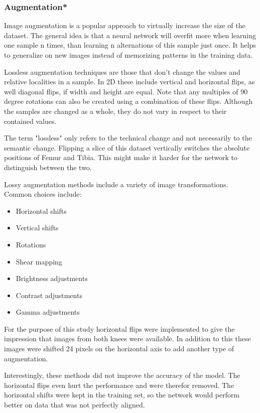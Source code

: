 \subsubsection{Augmentation*}

Image augmentation is a popular approach to virtually increase the size of the dataset. The general idea is that a neural network will overfit more when learning one sample n times, than learning n alternations of this sample just once. It helps to generalize on new images instead of memorizing patterns in the training data.

Lossless augmentation techniques are those that don't change the values and relative localities in a sample. In 2D these include vertical and horizontal flips, as well diagonal flips, if width and height are equal. Note that any multiples of 90 degree rotations can also be created using a combination of these flips. Although the samples are changed as a whole, they do not vary in respect to their contained values. 

The term "lossless" only refers to the technical change and not necessarily to the semantic change. Flipping a slice of this dataset vertically switches the absolute positions of Femur and Tibia. This might make it harder for the network to distinguish between the two.

Lossy augmentation methods include a variety of image transformations. Common choices include:

\begin{itemize}
\item Horizontal shifts
\item Vertical shifts
\item Rotations
\item Shear mapping
\item Brightness adjustments
\item Contrast adjustments
\item Gamma adjustments
\end{itemize}

For the purpose of this study horizontal flips were implemented to give the impression that images from both knees were available. In addition to this these images were shifted 24 pixels on the horizontal axis to add another type of augmentation. 

Interestingly, these methods did not improve the accuracy of the model. The horizontal flips even hurt the performance and were therefor removed. The horizontal shifts were kept in the training set, so the network would perform better on data that was not perfectly aligned.

